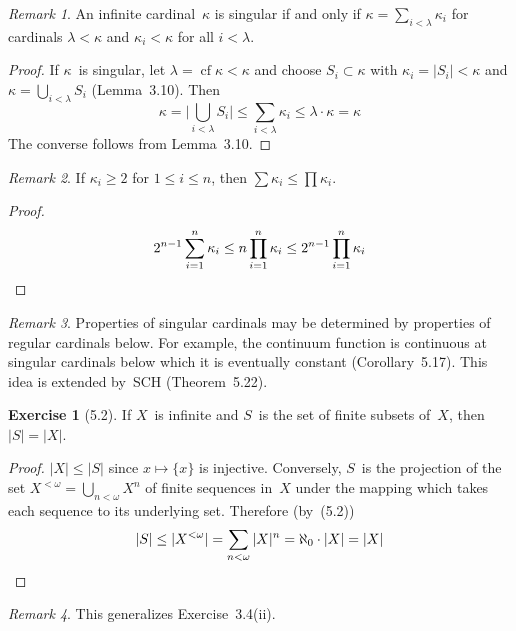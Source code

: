 \documentclass[letterpaper,12pt]{article}
\newcommand{\bigunion}{\bigcup}
\newcommand{\mult}{\cdot}
\DeclareMathOperator{\cf}{cf}
\newcommand{\card}[1]{|#1|}
\newcommand{\bigcard}[1]{\bigl|#1\bigr|}
\theoremstyle{definition}
\newtheorem*{exer}{Exercise}
\theoremstyle{remark}
\newtheorem*{rmk}{Remark}
\begin{document}
\begin{rmk}
An infinite cardinal~\(\kappa\) is singular if and only if \(\kappa=\sum_{i<\lambda}\kappa_i\) for cardinals \(\lambda<\kappa\) and \(\kappa_i<\kappa\) for all \(i<\lambda\).
\end{rmk}
\begin{proof}
If \(\kappa\)~is singular, let \(\lambda=\cf\kappa<\kappa\) and choose \(S_i\subset\kappa\) with \(\kappa_i=\card{S_i}<\kappa\) and \(\kappa=\bigunion_{i<\lambda}S_i\) (Lemma~3.10). Then
\[\kappa=\bigcard{\bigunion_{i<\lambda}S_i}\le\sum_{i<\lambda}\kappa_i\le\lambda\mult\kappa=\kappa\]
The converse follows from Lemma~3.10.
\end{proof}

\begin{rmk}
If \(\kappa_i\ge 2\) for \(1\le i\le n\), then \(\sum\kappa_i\le\prod\kappa_i\).
\end{rmk}
\begin{proof}
\[2^{n-1}\sum_{i=1}^n\kappa_i\le n\prod_{i=1}^n\kappa_i\le 2^{n-1}\prod_{i=1}^n\kappa_i\qedhere\]
\end{proof}

\begin{rmk}
Properties of singular cardinals may be determined by properties of regular cardinals below. For example, the continuum function is continuous at singular cardinals below which it is eventually constant (Corollary~5.17). This idea is extended by~SCH (Theorem~5.22).
\end{rmk}

\begin{exer}[5.2]
If \(X\)~is infinite and \(S\)~is the set of finite subsets of~\(X\), then \(\card{S}=\card{X}\).
\end{exer}
\begin{proof}
\(\card{X}\le\card{S}\) since \(x\mapsto\{x\}\) is injective. Conversely, \(S\)~is the projection of the set \(X^{<\omega}=\bigunion_{n<\omega}X^n\) of finite sequences in~\(X\) under the mapping which takes each sequence to its underlying set. Therefore (by~(5.2))
\[\card{S}\le\card{X^{<\omega}}=\sum_{n<\omega}\card{X}^n=\aleph_0\mult\card{X}=\card{X}\qedhere\]
\end{proof}
\begin{rmk}
This generalizes Exercise~3.4(ii).
\end{rmk}
\end{document}
